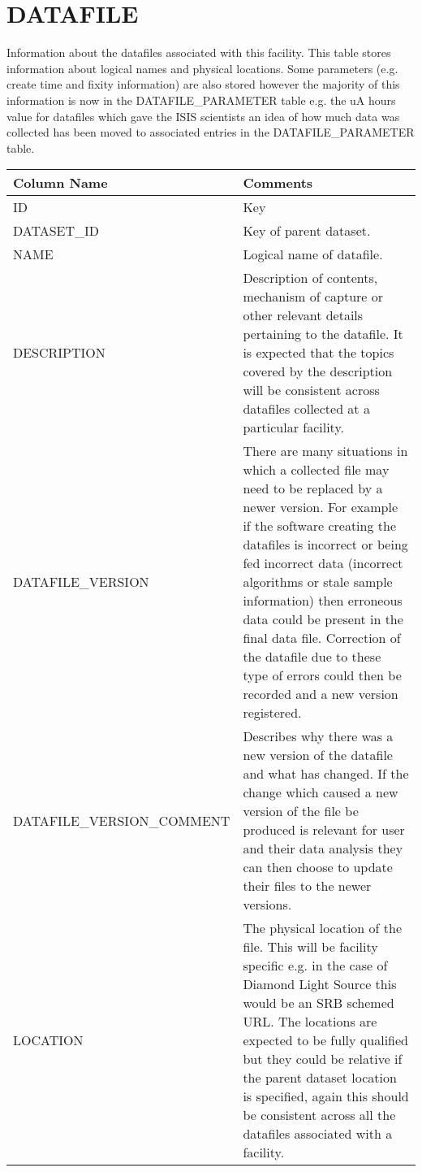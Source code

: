\documentclass{report}
\begin{document}
\section{DATAFILE}

Information about the datafiles associated with this facility. This table stores information about logical names and physical locations. Some parameters (e.g. create time and fixity information) are also stored however the majority of this information is now in the DATAFILE\_PARAMETER table e.g. the uA hours value for datafiles which gave the ISIS scientists an idea of how much data was collected has been moved to associated entries in the DATAFILE\_PARAMETER table.\\

\begin{tabular}{|l|l|}
\hline
Column Name & Comments \\ \hline
ID & \multicolumn{1}{p{100mm}|}{
Key} \\ \hline
DATASET\_ID & \multicolumn{1}{p{100mm}|}{
Key of parent dataset.} \\ \hline
NAME & \multicolumn{1}{p{100mm}|}{
Logical name of datafile.} \\ \hline
DESCRIPTION & \multicolumn{1}{p{100mm}|}{
Description of contents, mechanism of capture or other relevant details pertaining to the datafile. It is expected that the topics covered by the description will be consistent across datafiles collected at a particular facility.} \\ \hline
DATAFILE\_VERSION & \multicolumn{1}{p{100mm}|}{
There are many situations in which a collected file may need to be replaced by a newer version. For example if the software creating the datafiles is incorrect or being fed incorrect data (incorrect algorithms or stale sample information) then erroneous data could be present in the final data file. Correction of the datafile due to these type of errors could then be recorded and a new version registered.} \\ \hline
DATAFILE\_VERSION\_COMMENT & \multicolumn{1}{p{100mm}|}{
Describes why there was a new version of the datafile and what has changed. If the change which caused a new version of the file be produced is relevant for user and their data analysis they can then choose to update their files to the newer versions.} \\ \hline
LOCATION & \multicolumn{1}{p{100mm}|}{
The physical location of the file. This will be facility specific e.g. in the case of Diamond Light Source this would be an SRB schemed URL. The locations are expected to be fully qualified but they could be relative if the parent dataset location is specified, again this should be consistent across all the datafiles associated with a facility.} \\ \hline

\end{tabular}
\end{document}
